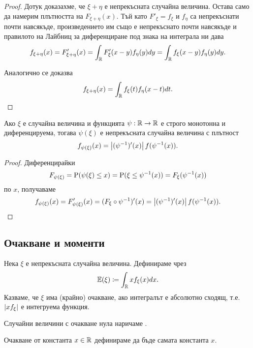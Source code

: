 \documentclass[numbers=endperiod, bibliography=totocnumbered]{scrartcl}
\begin{document}
\begin{proof}
  Дотук доказахме, че \( \xi + \eta \) е непрекъсната случайна величина. Остава само да намерим плътността на \( F_{\xi + \eta}(x) \). Тъй като \( F'_\xi = f_\xi \) и \( f_\eta \) са непрекъснати почти навсякъде, произведението им също е непрекъснато почти навсякъде и правилото на Лайбниц за диференциране под знака на интеграла ни дава
  \begin{align*}
    f_{\xi + \eta} (x)
    =
    F'_{\xi + \eta} (x)
    =
    \int_{\mathbb{R}} F'_\xi(x - y) f_\eta(y) dy
    =
    \int_{\mathbb{R}} f_\xi(x - y) f_\eta(y) dy.
  \end{align*}

  Аналогично се доказва
  \begin{align*}
    f_{\xi + \eta} (x)
    =
    \int_{\mathbb{R}} f_\xi(t) f_\eta(x - t) dt.
  \end{align*}
\end{proof}

\begin{proposition}\label{thm:transformation-density}
  Ако \( \xi \) е случайна величина и функцията \( \psi: \mathbb{R} \to \mathbb{R} \) е строго монотонна и диференцируема, тогава \( \psi(\xi) \) е непрекъсната случайна величина с плътност
  \begin{align*}
    f_{\psi(\xi)} (x)
    =
    \left\vert (\psi^{-1})'(x) \right\vert f(\psi^{-1}(x)).
  \end{align*}
\end{proposition}
\begin{proof} Диференцирайки
  \begin{align*}
    F_{\psi(\xi)} = \operatorname{P}(\psi(\xi) \leq x) = \operatorname{P}(\xi \leq \psi^{-1}(x)) = F_\xi(\psi^{-1}(x))
  \end{align*}
  по \( x \), получаваме
  \begin{align*}
    f_{\psi(\xi)} (x)
    =
    F'_{\psi(\xi)} (x)
    =
    (F_{\xi} \circ \psi^{-1})'(x)
    =
    \left\vert (\psi^{-1})'(x) \right\vert f(\psi^{-1}(x)).
  \end{align*}
\end{proof}

\subsection{Очакване и моменти}

\begin{definition}
  Нека \( \xi \) е непрекъсната случайна величина. Дефинираме  чрез
  \begin{align*}
    \mathbb{E}(\xi) \coloneqq \int_{\mathbb{R}} x f_\xi(x) dx.
  \end{align*}
  Казваме, че \( \xi \) има (крайно) очакване, ако интегралът е абсолютно сходящ, т.е. \( \left\vert x f_\xi \right\vert \) е интегруема функция.

  Случайни величини с очакване нула наричаме .

  Очакване от константа \( x \in \mathbb{R} \) дефинираме да бъде самата константа \( x \).
\end{definition}
\end{document}
